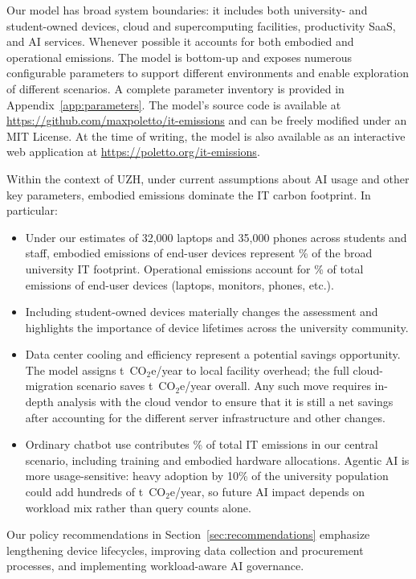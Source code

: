 \documentclass[11pt]{article}
\newcommand{\coe}{CO$_2$e}
\newcommand{\tcoe}{t~\coe}
\begin{document}
Our model has broad system boundaries: it includes both university- and
student-owned devices, cloud and supercomputing facilities, productivity SaaS,
and AI services. Whenever possible it accounts for both embodied and operational
emissions. The model is bottom-up and exposes numerous configurable parameters
to support different environments and enable exploration of different scenarios.
A complete parameter inventory is provided in Appendix~\ref{app:parameters}. The
model's source code is available at
\url{https://github.com/maxpoletto/it-emissions} and can be freely modified
under an MIT License. At the time of writing, the model is also available as an
interactive web application at \url{https://poletto.org/it-emissions}.

Within the context of UZH, under current assumptions about AI usage and other
key parameters, embodied emissions dominate the IT carbon footprint. In
particular:

\begin{itemize}

  \item Under our estimates of 32,000 laptops and 35,000 phones across students
  and staff, embodied emissions of end-user devices
  represent \ModelEndUserEmbodiedPercent{}\% of the broad university IT footprint.
  Operational emissions account for \ModelEndUserOperationalPercent{}\% of total emissions of end-user devices
  (laptops, monitors, phones, etc.).

  \item Including student-owned devices materially changes the assessment and
  highlights the importance of device lifetimes across the university community.

  \item Data center cooling and efficiency represent a potential savings
  opportunity. The model assigns \ModelLocalOverheadT{} \tcoe/year to local
  facility overhead; the full cloud-migration scenario saves
  \ModelCloudSavingT{} \tcoe/year overall. Any such move requires in-depth analysis with the
  cloud vendor to ensure that it is still a net savings after accounting for the
  different server infrastructure and other changes.

  \item Ordinary chatbot use contributes \ModelChatPercent{}\% of total IT emissions
  in our central scenario, including training and embodied hardware allocations.
  Agentic AI is more usage-sensitive: heavy adoption by 10\% of the university
  population could add hundreds of \tcoe/year, so future AI impact depends on
  workload mix rather than query counts alone.

\end{itemize}

Our policy recommendations in Section~\ref{sec:recommendations} emphasize
lengthening device lifecycles, improving data collection and procurement
processes, and implementing workload-aware AI governance.

\appendix


\printbibliography
\end{document}
